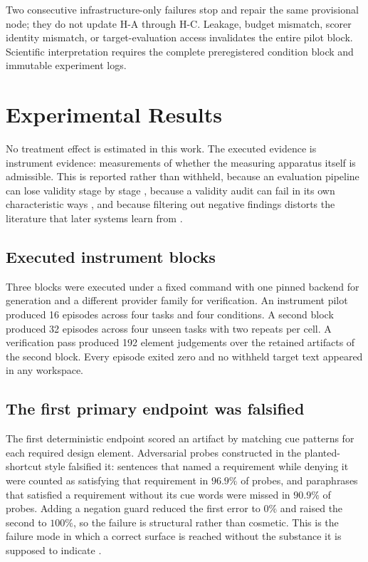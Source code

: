 \documentclass[11pt,a4paper]{article}
\begin{document}
Two consecutive infrastructure-only failures stop and repair the same provisional
node; they do not update H-A through H-C.  Leakage, budget mismatch, scorer
identity mismatch, or target-evaluation access invalidates the entire pilot
block.  Scientific interpretation requires the complete preregistered condition
block and immutable experiment logs.

\section{Experimental Results}

No treatment effect is estimated in this work.  The executed evidence is
instrument evidence: measurements of whether the measuring apparatus itself is
admissible.  This is reported rather than withheld, because an evaluation
pipeline can lose validity stage by stage \citep{compounding2026}, because a
validity audit can fail in its own characteristic ways \citep{auditaudit2026},
and because filtering out negative findings distorts the literature that later
systems learn from \citep{negativeresults2026}.

\subsection{Executed instrument blocks}

Three blocks were executed under a fixed command with one pinned backend for
generation and a different provider family for verification.  An instrument
pilot produced 16 episodes across four tasks and four conditions.  A second
block produced 32 episodes across four unseen tasks with two repeats per cell.
A verification pass produced 192 element judgements over the retained artifacts
of the second block.  Every episode exited zero and no withheld target text
appeared in any workspace.

\subsection{The first primary endpoint was falsified}

The first deterministic endpoint scored an artifact by matching cue patterns for
each required design element.  Adversarial probes constructed in the
planted-shortcut style \citep{baitbench2026} falsified it: sentences that named
a requirement while denying it were counted as satisfying that requirement in
$96.9\%$ of probes, and paraphrases that satisfied a requirement without its cue
words were missed in $90.9\%$ of probes.  Adding a negation guard reduced the
first error to $0\%$ and raised the second to $100\%$, so the failure is
structural rather than cosmetic.  This is the failure mode in which a correct
surface is reached without the substance it is supposed to indicate
\citep{solutionhacking2026}.
\end{document}
